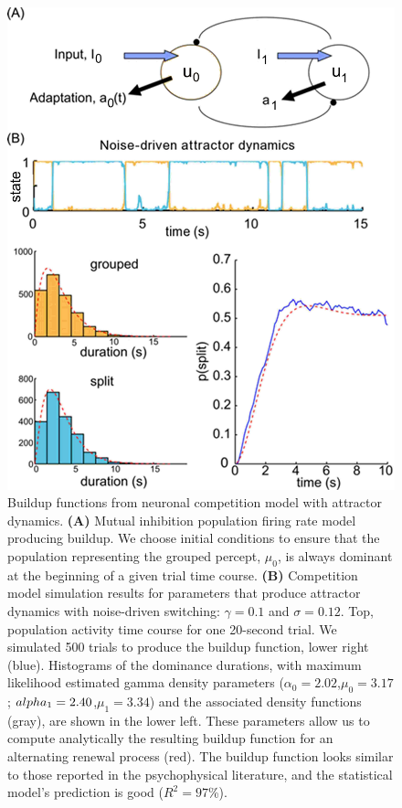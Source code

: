 \begin{figure}
	\centering
	\includegraphics[scale=1.3]{ch2Figs/4-comp_model_hists_bufs_attr.jpg}
	\caption{Buildup functions from neuronal competition model with attractor dynamics. \textbf{(A)} Mutual inhibition population firing rate model producing buildup. We choose initial conditions to ensure that the population representing the grouped percept, $\mu_0$, is always dominant at the beginning of a given trial time course. \textbf{(B)} Competition model simulation results for parameters that produce attractor dynamics with noise-driven switching: $\gamma=0.1$ and $\sigma=0.12$. Top, population activity time course for one 20-second trial. We simulated 500 trials to produce the buildup function, lower right (blue). Histograms of the dominance durations, with maximum likelihood estimated gamma density parameters ($\alpha_0=2.02$,$\mu_0=3.17$; $\\alpha_1=2.40$,$\mu_1=3.34$) and the associated density functions (gray), are shown in the lower left. These parameters allow us to compute analytically the resulting buildup function for an alternating renewal process (red). The buildup function looks similar to those reported in the psychophysical literature, and the statistical model’s prediction is good ($R^2=97$\%).}
	\label{fig:compModel}
\end{figure}

